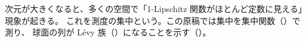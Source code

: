 次元が大きくなると、多くの空間で「1-Lipschitz 関数がほとんど定数に見える」現象が起きる。
これを測度の集中という。この原稿では集中を集中関数（）で測り、
球面の列が Lévy 族（）になることを示す（）。
